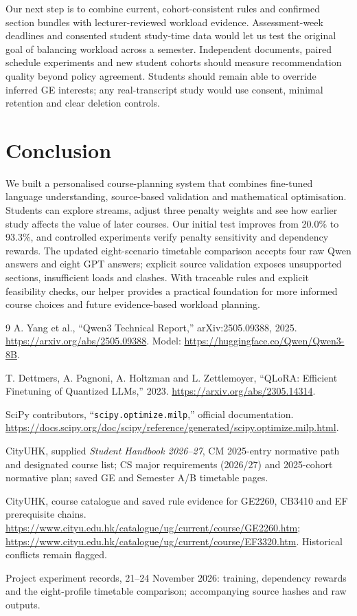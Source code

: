 \documentclass{article}
\begin{document}
Our next step is to combine current, cohort-consistent rules and confirmed section bundles with lecturer-reviewed workload evidence. Assessment-week deadlines and consented student study-time data would let us test the original goal of balancing workload across a semester. Independent documents, paired schedule experiments and new student cohorts should measure recommendation quality beyond policy agreement. Students should remain able to override inferred GE interests; any real-transcript study would use consent, minimal retention and clear deletion controls.

\section{Conclusion}
We built a personalised course-planning system that combines fine-tuned language understanding, source-based validation and mathematical optimisation. Students can explore streams, adjust three penalty weights and see how earlier study affects the value of later courses. Our initial test improves from 20.0\% to 93.3\%, and controlled experiments verify penalty sensitivity and dependency rewards. The updated eight-scenario timetable comparison accepts four raw Qwen answers and eight GPT answers; explicit source validation exposes unsupported sections, insufficient loads and clashes. With traceable rules and explicit feasibility checks, our helper provides a practical foundation for more informed course choices and future evidence-based workload planning.

\begin{thebibliography}{9}
\footnotesize
\setlength{\itemsep}{0pt}
\setlength{\parsep}{0pt}
A. Yang et al., ``Qwen3 Technical Report,'' arXiv:2505.09388, 2025.
\url{https://arxiv.org/abs/2505.09388}. Model: \url{https://huggingface.co/Qwen/Qwen3-8B}.

T. Dettmers, A. Pagnoni, A. Holtzman and L. Zettlemoyer, ``QLoRA: Efficient Finetuning of Quantized LLMs,'' 2023. \url{https://arxiv.org/abs/2305.14314}.

SciPy contributors, ``\texttt{scipy.optimize.milp},'' official documentation.
\url{https://docs.scipy.org/doc/scipy/reference/generated/scipy.optimize.milp.html}.

CityUHK, supplied \emph{Student Handbook 2026--27}, CM 2025-entry normative path and designated course list; CS major requirements (2026/27) and 2025-cohort normative plan; saved GE and Semester A/B timetable pages.

CityUHK, course catalogue and saved rule evidence for GE2260, CB3410 and EF prerequisite chains. \url{https://www.cityu.edu.hk/catalogue/ug/current/course/GE2260.htm}; \url{https://www.cityu.edu.hk/catalogue/ug/current/course/EF3320.htm}. Historical conflicts remain flagged.

Project experiment records, 21--24 November 2026: training, dependency rewards and the eight-profile timetable comparison; accompanying source hashes and raw outputs.
\end{thebibliography}
\end{document}

